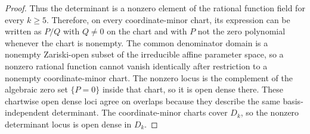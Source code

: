 \begin{unverified}
\begin{proof}
Thus the determinant is a nonzero element of the rational function field for
every \(k\ge5\).  Therefore, on every coordinate-minor chart, its expression
can be written as \(P/Q\) with \(Q\ne0\) on the chart and with \(P\) not the
zero polynomial whenever the chart is nonempty.  The common denominator
domain is a nonempty Zariski-open subset of the irreducible affine parameter
space, so a nonzero rational function cannot vanish identically after
restriction to a nonempty coordinate-minor chart.  The nonzero locus is the
complement of the algebraic zero
set \(\{P=0\}\) inside that chart, so it is open dense there.  These chartwise
open dense loci agree on overlaps because they describe the same
basis-independent determinant.  The coordinate-minor charts cover \(D_k\), so
the nonzero determinant locus is open dense in \(D_k\).
\end{proof}
\end{unverified}

